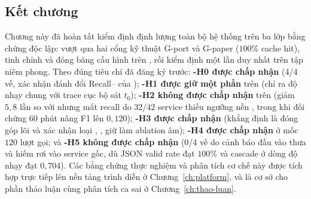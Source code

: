 \subsection{Kết chương}
\label{sec:ch5-ket-chuong}

Chương này đã hoàn tất kiểm định định lượng toàn bộ hệ thống trên ba lớp bằng chứng độc lập: vượt qua hai cổng kỹ thuật G-port và G-paper ($100\%$ cache hit), tinh chỉnh và đóng băng cấu hình trên , rồi kiểm định một lần duy nhất trên tập  niêm phong. Theo đúng tiêu chí đã đăng ký trước: \textbf{\hyp{H0} được chấp nhận} (4/4 vế, xác nhận đánh đổi Recall-- của ); \textbf{\hyp{H1} được giữ một phần} trên  (chỉ ra độ nhạy chung với trace cục bộ sát $t_0$); \textbf{\hyp{H2} không được chấp nhận} trên  (giảm  $5{,}8$ lần so với  nhưng mất recall do $32/42$ service thiếu ngưỡng nền , trong khi đối chứng  60 phút nâng F1 lên $0{,}120$); \textbf{\hyp{H3} được chấp nhận} (khẳng định  là đóng góp lõi và xác nhận loại , , giữ  làm ablation âm); \textbf{\hyp{H4} được chấp nhận} ở mốc $120$ lượt gọi; và \textbf{\hyp{H5} không được chấp nhận} (0/4 vế do cảnh báo đầu vào thưa và hiếm rơi vào service gốc, dù JSON valid rate đạt $100\%$ và  cascade ở dòng độ nhạy đạt $0{,}704$). Các bằng chứng thực nghiệm và phân tích cơ chế này được tích hợp trực tiếp lên nền tảng trình diễn ở Chương~\ref{ch:platform}, và là cơ sở cho phần thảo luận cùng phân tích ca sai ở Chương~\ref{ch:thao-luan}.
